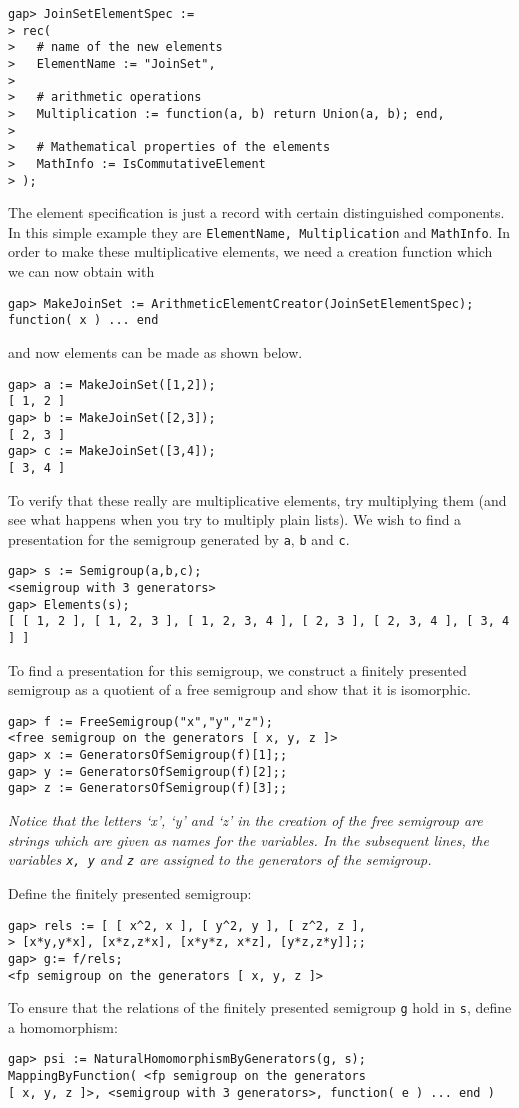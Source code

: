 \documentclass[12pt]{article}
\theoremstyle{plain} \newtheorem{Thm}{Theorem}
\theoremstyle{plain} \newtheorem{Cor}{Corollary}
\theoremstyle{plain} \newtheorem{Lemma}{Lemma}
\theoremstyle{plain} \newtheorem{Prop}{Proposition}
\theoremstyle{plain} \newtheorem{Ex}{Exercise}
\begin{document}
\begin{verbatim}
gap> JoinSetElementSpec :=
> rec(
>   # name of the new elements
>   ElementName := "JoinSet",
> 
>   # arithmetic operations
>   Multiplication := function(a, b) return Union(a, b); end,
> 
>   # Mathematical properties of the elements
>   MathInfo := IsCommutativeElement
> );
\end{verbatim}
The element specification is just a record with certain distinguished
components. In this simple example they are
{\tt ElementName, Multiplication} and {\tt MathInfo}.
In order to make these multiplicative elements, we need a 
creation function which we can now obtain with
\begin{verbatim}
gap> MakeJoinSet := ArithmeticElementCreator(JoinSetElementSpec);
function( x ) ... end
\end{verbatim}
and now elements can be made as shown below.
\begin{verbatim}
gap> a := MakeJoinSet([1,2]);
[ 1, 2 ]
gap> b := MakeJoinSet([2,3]);
[ 2, 3 ]
gap> c := MakeJoinSet([3,4]);
[ 3, 4 ]
\end{verbatim}
To verify that these really are multiplicative elements, 
try multiplying them (and see what happens when you 
try to multiply plain lists).
We wish to find a presentation for the semigroup generated by
{\tt a}, {\tt b} and {\tt c}.
\begin{verbatim}
gap> s := Semigroup(a,b,c);
<semigroup with 3 generators>
gap> Elements(s);
[ [ 1, 2 ], [ 1, 2, 3 ], [ 1, 2, 3, 4 ], [ 2, 3 ], [ 2, 3, 4 ], [ 3, 4 ] ]
\end{verbatim}

To find a presentation for this semigroup, we construct a finitely
presented semigroup as a quotient of a free semigroup and
show that it is isomorphic.
\begin{verbatim}
gap> f := FreeSemigroup("x","y","z");
<free semigroup on the generators [ x, y, z ]>
gap> x := GeneratorsOfSemigroup(f)[1];;
gap> y := GeneratorsOfSemigroup(f)[2];;
gap> z := GeneratorsOfSemigroup(f)[3];;
\end{verbatim}
{\em Notice that the letters `x', `y' and `z' in the creation of the 
free semigroup are strings which are given as names for the variables.
In the subsequent lines, the variables {\tt x, y} and {\tt z} are assigned
to the generators of the semigroup.}

Define the finitely presented semigroup:
\begin{verbatim}
gap> rels := [ [ x^2, x ], [ y^2, y ], [ z^2, z ], 
> [x*y,y*x], [x*z,z*x], [x*y*z, x*z], [y*z,z*y]];;
gap> g:= f/rels;                                                               
<fp semigroup on the generators [ x, y, z ]>
\end{verbatim}
To ensure that the relations of the finitely presented semigroup {\tt g}
hold in {\tt s}, define a homomorphism:
\begin{verbatim}
gap> psi := NaturalHomomorphismByGenerators(g, s);                             
MappingByFunction( <fp semigroup on the generators 
[ x, y, z ]>, <semigroup with 3 generators>, function( e ) ... end )
\end{verbatim}
\end{document}
